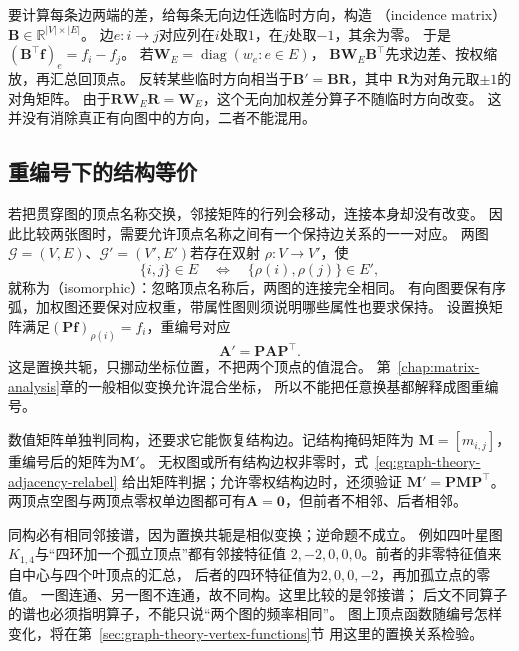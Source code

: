 要计算每条边两端的差，给每条无向边任选临时方向，构造
（incidence matrix）
\(\bm B\in\mathbb R^{|V|\times|E|}\)。
边\(e:i\to j\)对应列在\(i\)处取\(1\)，在\(j\)处取\(-1\)，其余为零。
于是\((\bm B^\top\bm f)_e=f_i-f_j\)。
若\(\bm W_E=\operatorname{diag}(w_e:e\in E)\)，
\(\bm B\bm W_E\bm B^\top\)先求边差、按权缩放，再汇总回顶点。
反转某些临时方向相当于\(\bm B'=\bm B\bm R\)，其中
\(\bm R\)为对角元取\(\pm1\)的对角矩阵。
由于\(\bm R\bm W_E\bm R=\bm W_E\)，这个无向加权差分算子不随临时方向改变。
这并没有消除真正有向图中的方向，二者不能混用。

\subsection{重编号下的结构等价}
\label{sec:graph-theory-graph-isomorphism}

若把贯穿图的顶点名称交换，邻接矩阵的行列会移动，连接本身却没有改变。
因此比较两张图时，需要允许顶点名称之间有一个保持边关系的一一对应。
两图\(\mathcal G=(V,E)\)、\(\mathcal G'=(V',E')\)若存在双射
\(\rho:V\to V'\)，使
\[
  \{i,j\}\in E
  \quad\Longleftrightarrow\quad
  \{\rho(i),\rho(j)\}\in E',
\]
就称为（isomorphic）：忽略顶点名称后，两图的连接完全相同。
有向图要保有序弧，加权图还要保对应权重，带属性图则须说明哪些属性也要求保持。
设置换矩阵满足\((\bm P\bm f)_{\rho(i)}=f_i\)，重编号对应
\begin{equation}
  \bm A'=\bm P\bm A\bm P^\top.
  \label{eq:graph-theory-adjacency-relabel}
\end{equation}
这是置换共轭，只挪动坐标位置，不把两个顶点的值混合。
第~\ref{chap:matrix-analysis}章的一般相似变换允许混合坐标，
所以不能把任意换基都解释成图重编号。

数值矩阵单独判同构，还要求它能恢复结构边。记结构掩码矩阵为
\(\bm M=[m_{i,j}]\)，重编号后的矩阵为\(\bm M'\)。
无权图或所有结构边权非零时，式~\eqref{eq:graph-theory-adjacency-relabel}
给出矩阵判据；允许零权结构边时，还须验证
\(\bm M'=\bm P\bm M\bm P^\top\)。
两顶点空图与两顶点零权单边图都可有\(\bm A=\bm0\)，但前者不相邻、后者相邻。

同构必有相同邻接谱，因为置换共轭是相似变换；逆命题不成立。
例如四叶星图\(K_{1,4}\)与“四环加一个孤立顶点”都有邻接特征值
\(2,-2,0,0,0\)。前者的非零特征值来自中心与四个叶顶点的汇总，
后者的四环特征值为\(2,0,0,-2\)，再加孤立点的零值。
一图连通、另一图不连通，故不同构。这里比较的是邻接谱；
后文不同算子的谱也必须指明算子，不能只说“两个图的频率相同”。
图上顶点函数随编号怎样变化，将在第~\ref{sec:graph-theory-vertex-functions}节
用这里的置换关系检验。


